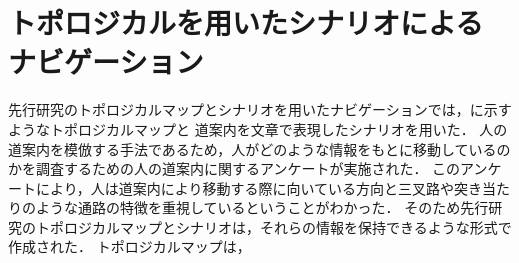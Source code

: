 \documentclass[../main]{subfiles}
\begin{document}
\setcounter{secnumdepth}{1}
    \chapter{トポロジカルを用いたシナリオによる\\ナビゲーション}
    \vspace{1cm}
    先行研究のトポロジカルマップとシナリオを用いたナビゲーションでは，に示すようなトポロジカルマップと
    道案内を文章で表現したシナリオを用いた．
    人の道案内を模倣する手法であるため，人がどのような情報をもとに移動しているのかを調査するための人の道案内に関するアンケートが実施された．
    このアンケートにより，人は道案内により移動する際に向いている方向と三叉路や突き当たりのような通路の特徴を重視しているということがわかった．
    そのため先行研究のトポロジカルマップとシナリオは，それらの情報を保持できるような形式で作成された．
    トポロジカルマップは，
\end{document}
